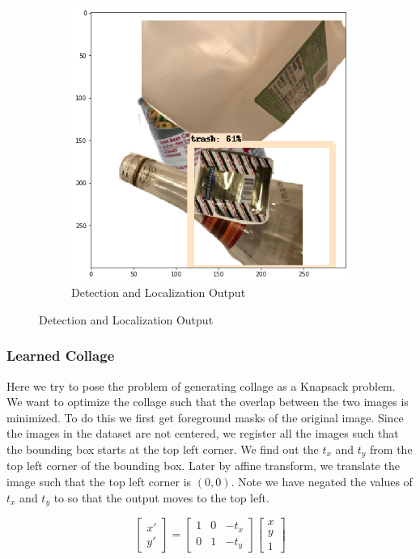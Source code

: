 \documentclass{article}
\begin{document}
\begin{figure}
\begin{subfigure}{0.3\linewidth}
    \includegraphics[width=\linewidth]{data/images/section_4_random_collage/Output_2.png}
    \caption{Detection and Localization Output}
    \end{subfigure}
    
    \label{fig:random_collage}
\end{figure}



\subsubsection{Learned Collage}
Here we try to pose the problem of generating collage as a Knapsack problem. We want to optimize the collage such that the overlap between the two images is minimized. To do this we first get foreground masks of the original image. Since the images in the dataset are not centered, we register all the images such that the bounding box starts at the top left corner. We find out the $t_{x}$ and $t_{y}$  from the top left corner of the bounding box. Later by affine transform, we translate the image such that the top left corner is $(0,0)$. Note we have negated the values of  $t_{x}$ and $t_{y}$  to so that the output moves to the top left.

\begin{equation}
\begin{bmatrix}
x'\\
y'
\end{bmatrix}
= 
\begin{bmatrix}
1 & 0 & -t_{x}\\
0 & 1 & -t_{y}
\end{bmatrix}
\begin{bmatrix}
x\\
y\\
1
\end{bmatrix}
\end{equation}
\end{document}
